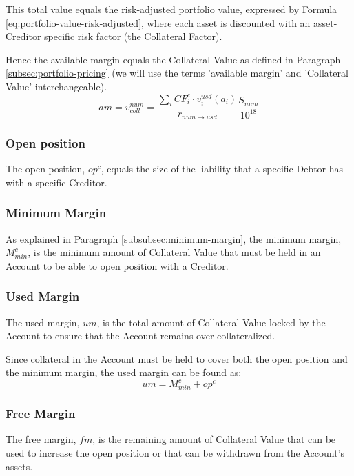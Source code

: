 \documentclass[sigconf,nonacm]{acmart}
\begin{document}
This total value equals the risk-adjusted portfolio value, expressed by Formula \ref{eq:portfolio-value-risk-adjusted},
where each asset is discounted with an asset-Creditor specific risk factor (the Collateral Factor).

Hence the available margin equals the Collateral Value as defined in Paragraph \ref{subsec:portfolio-pricing}
(we will use the terms 'available margin' and 'Collateral Value' interchangeable).
\begin{equation}
    \label{eq:available-margin}
    am = v_{coll}^{num} = \frac{\sum_{i}{CF_{i}^{c} \cdot v^{usd}_{i}(a_{i})}}{r_{num\rightarrow usd}}\frac{S_{num}}{10^{18}}
\end{equation}

\subsubsection{Open position}
The open position, $op^c$, equals the size of the liability that a specific Debtor has with a specific Creditor.

\subsubsection{Minimum Margin}
As explained in Paragraph \ref{subsubsec:minimum-margin}, the minimum margin, $M_{min}^c$, 
is the minimum amount of Collateral Value that must be held in an Account to be able to open position with a Creditor.

\subsubsection{Used Margin}
The used margin, $um$, is the total amount of Collateral Value locked by the Account to ensure that the Account remains over-collateralized.

Since collateral in the Account must be held to cover both the open position and the minimum margin, the used margin can be found as:
\begin{equation}
    um = M_{min}^c + op^c
\end{equation}

\subsubsection{Free Margin}
The free margin, $fm$, is the remaining amount of Collateral Value that can be used to increase the open position or that can be withdrawn from the Account's assets.
\end{document}
